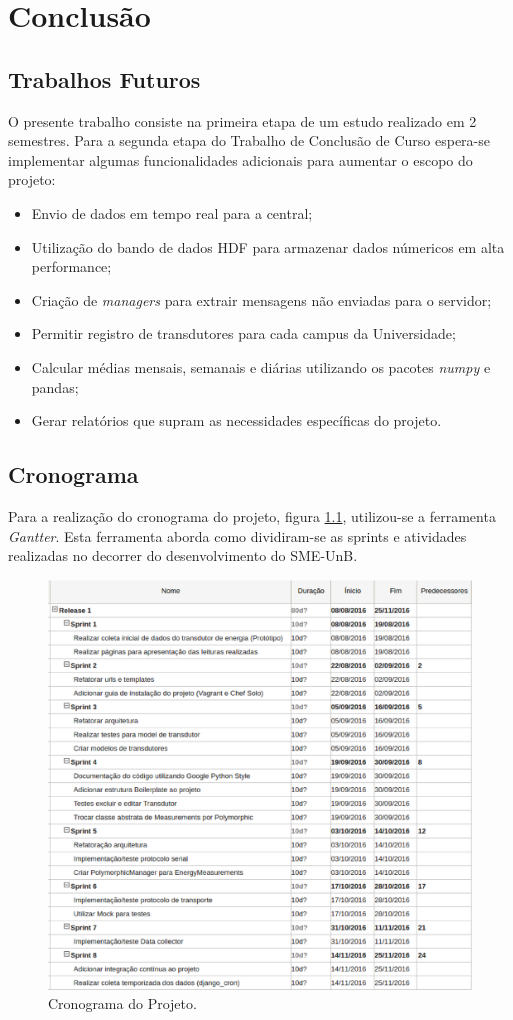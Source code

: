 \chapter{Conclusão}

\section{Trabalhos Futuros}
O presente trabalho consiste na primeira etapa de um estudo realizado em 2 semestres. Para a segunda etapa do Trabalho de Conclusão de Curso espera-se implementar algumas funcionalidades adicionais para aumentar o escopo do projeto:
\begin{itemize}
    \item Envio de dados em tempo real para a central;
    \item Utilização do bando de dados HDF para armazenar dados númericos em alta performance;
    \item Criação de \textit{managers} para extrair mensagens não enviadas para o servidor;
    \item Permitir registro de transdutores para cada campus da Universidade;
    \item Calcular médias mensais, semanais e diárias utilizando os pacotes \textit{numpy} e {pandas};
    \item Gerar relatórios que supram as necessidades específicas do projeto.
\end{itemize}

\section{Cronograma}
Para a realização do cronograma do projeto, figura \ref{cronograma}, utilizou-se a ferramenta \textit{Gantter}. Esta ferramenta aborda como dividiram-se as sprints e atividades realizadas no decorrer do desenvolvimento do SME-UnB.

\begin{figure}[!htpb]
    \centering
    \includegraphics[keepaspectratio=true,scale=0.5]{figuras/cronograma.eps}
    \caption{Cronograma do Projeto.}
    \label{cronograma}
\end{figure}